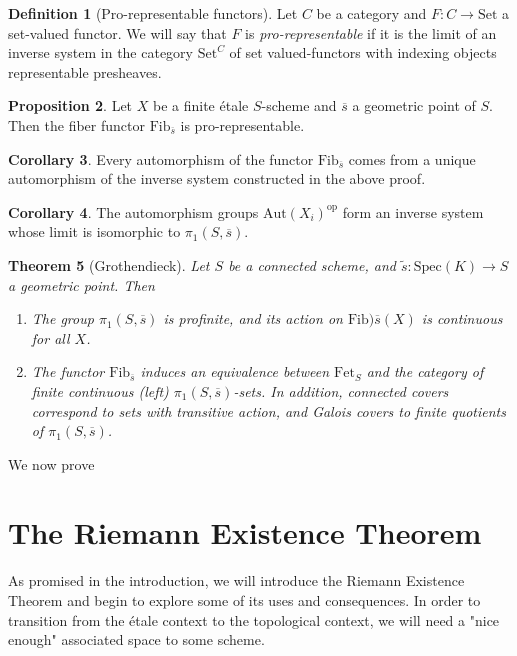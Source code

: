 \documentclass{article}
\newtheorem{theorem}{Theorem}[section]
\theoremstyle{definition}
\newtheorem{corollary}[theorem]{Corollary}
\newtheorem{proposition}[theorem]{Proposition}
\newtheorem{definition}[theorem]{Definition}
\theoremstyle{remark}
\begin{document}
\begin{definition}[Pro-representable functors]
	Let $C$ be a category and $F: C \to \text{Set}$ a set-valued functor.
	We will say that $F$ is \textit{pro-representable} if it is the limit of an inverse system in the category $\text{Set}^C$ of set valued-functors with indexing objects representable presheaves.
\end{definition} 

\begin{proposition}
	Let $X$ be a finite \'etale $S$-scheme and $\overline{s}$ a geometric point of $S$.
	Then the fiber functor $\text{Fib}_{\overline{s}}$ is pro-representable.
\end{proposition}

\begin{corollary}
	Every automorphism of the functor $\text{Fib}_{\overline{s}}$ comes from a unique automorphism of the inverse system constructed in the above proof.
\end{corollary}

\begin{corollary}
	The automorphism groups $\text{Aut}(X_i)^{\text{op}}$ form an inverse system whose limit is isomorphic to $\pi_1(S, \overline{s})$.
\end{corollary}

\begin{theorem}[Grothendieck]
	Let $S$ be a connected scheme, and $\widetilde{s}: \text{Spec}(K) \to S$ a geometric point. Then \begin{enumerate} 
		\item The group $\pi_1(S, \overline{s})$ is profinite, and its action on $\text{Fib}){\overline{s}}(X)$ is continuous for all $X$.
		\item The functor $\text{Fib}_{\overline{s}}$ induces an equivalence between $\text{Fet}_S$ and the category of finite continuous (left) $\pi_1(S, \overline{s})$-sets.	In addition, connected covers correspond to sets with transitive action, and Galois covers to finite quotients of $\pi_1(S, \overline{s})$.
 \end{enumerate} 
\end{theorem}

We now prove 


\section{The Riemann Existence Theorem}

As promised in the introduction, we will introduce the Riemann Existence Theorem and begin to explore some of its uses and consequences.
In order to transition from the \'etale context to the topological context, we will need a "nice enough" associated space to some scheme.\\
\end{document}
